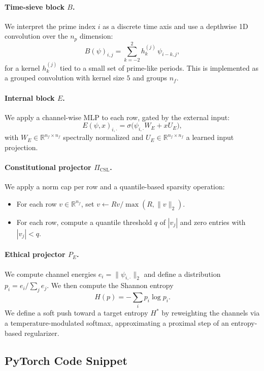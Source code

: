 \documentclass[11pt]{article}
\theoremstyle{definition}
\theoremstyle{plain}
\begin{document}
\paragraph{Time-sieve block $B$.}
We interpret the prime index $i$ as a discrete time axis and use a depthwise 1D convolution over the $n_p$ dimension:
\[
  B(\psi)_{i,j} = \sum_{k=-2}^2 h_k^{(j)}\,\psi_{i-k,j},
\]
for a kernel $h_k^{(j)}$ tied to a small set of prime-like periods.
This is implemented as a grouped convolution with kernel size $5$ and groups $n_f$.

\paragraph{Internal block $E$.}
We apply a channel-wise MLP to each row, gated by the external input:
\[
  E(\psi,x)_{i,\cdot} = \sigma\bigl(\psi_{i,\cdot} W_E + x U_E\bigr),
\]
with $W_E \in \mathbb{R}^{n_f \times n_f}$ spectrally normalized and $U_E \in \mathbb{R}^{n_f \times n_f}$ a learned input projection.

\paragraph{Constitutional projector $\Pi_{\mathrm{CSL}}$.}
We apply a norm cap per row and a quantile-based sparsity operation:
\begin{itemize}[leftmargin=*]
  \item For each row $v \in \mathbb{R}^{n_f}$, set $v \leftarrow R v / \max(R,\|v\|_2)$.
  \item For each row, compute a quantile threshold $q$ of $|v_j|$ and zero entries with $|v_j| < q$.
\end{itemize}

\paragraph{Ethical projector $P_E$.}
We compute channel energies $e_i = \|\psi_{i,\cdot}\|_2$ and define a distribution $p_i = e_i / \sum_j e_j$.
We then compute the Shannon entropy
\[
  H(p) = -\sum_{i} p_i \log p_i.
\]
We define a soft push toward a target entropy $H^\ast$ by reweighting the channels via a temperature-modulated softmax, approximating a proximal step of an entropy-based regularizer.

\subsection{PyTorch Code Snippet}
\end{document}
